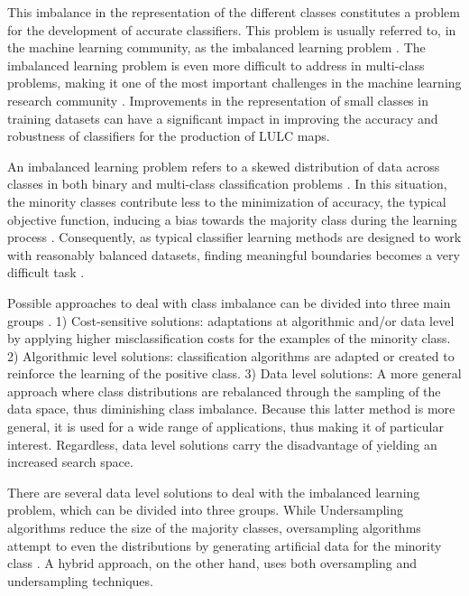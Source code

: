 \documentclass[parskip=full]{scrartcl}
\begin{document}
This imbalance in the representation of the different classes constitutes a
problem for the development of accurate classifiers. This problem is usually
referred to, in the machine learning community, as the imbalanced learning
problem \cite{Chawla2004}. The imbalanced learning problem is even more
difficult to address in multi-class problems, making it one of the most
important challenges in the machine learning research community
\cite{Garcia2018}. Improvements in the representation of small classes in
training datasets can have a significant impact in improving the accuracy and
robustness of classifiers for the production of LULC maps.

An imbalanced learning problem refers to a skewed distribution of data across
classes in both binary and multi-class classification problems \cite{Abdi2016}.
In this situation, the minority classes contribute less to the minimization of
accuracy, the typical objective function, inducing a bias towards the majority
class during the learning process \cite{Douzas2019}. Consequently, as typical
classifier learning methods are designed to work with reasonably balanced
datasets, finding meaningful boundaries becomes a very difficult task
\cite{Saez2016}.

Possible approaches to deal with class imbalance can be divided into three main
groups \cite{Fernandez2013}. 1) Cost-sensitive solutions: adaptations at
algorithmic and/or data level by applying higher misclassification costs for the
examples of the minority class. 2) Algorithmic level solutions: classification
algorithms are adapted or created to reinforce the learning of the positive
class. 3) Data level solutions: A more general approach where class
distributions are rebalanced through the sampling of the data space, thus
diminishing class imbalance. Because this latter method is more general, it is
used for a wide range of applications, thus making it of particular interest.
Regardless, data level solutions carry the disadvantage of yielding an increased
search space.

There are several data level solutions to deal with the imbalanced learning
problem, which can be divided into three groups. While Undersampling algorithms
reduce the size of the majority classes, oversampling algorithms attempt to
even the distributions by generating artificial data for the minority class
\cite{Mellor2015}. A hybrid approach, on the other hand, uses both oversampling
and undersampling techniques.
\end{document}
